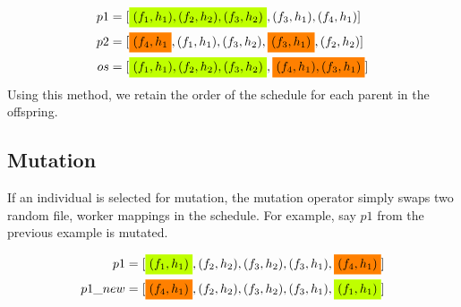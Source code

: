 \begin{align}
 p1 & = [\mathcolorbox{lime}{(f_1, h_1), (f_2, h_2), (f_3, h_2)}, (f_3, h_1), (f_4, h_1)] \nonumber \\
 p2 & = [\mathcolorbox{orange}{(f_4, h_1}, (f_1, h_1),(f_3, h_2), \mathcolorbox{orange}{(f_3, h_1)}, (f_2, h_2)] \nonumber \\
 os & = [\mathcolorbox{lime}{(f_1, h_1), (f_2, h_2), (f_3, h_2)}, \mathcolorbox{orange}{(f_4, h_1), (f_3, h_1)}] \nonumber
\end{align}
Using this method, we retain the order of the schedule for each parent in the offspring.

\subsection*{Mutation}
If an individual is selected for mutation, the mutation operator simply swaps
two random file, worker mappings in the schedule. For example, say $p1$ from
the previous example is mutated.

\begin{align}
 p1 & = [\mathcolorbox{lime}{(f_1, h_1)}, (f_2, h_2), (f_3, h_2), (f_3, h_1), \mathcolorbox{orange}{(f_4, h_1)}] \nonumber \\
 p1\_new & = [\mathcolorbox{orange}{(f_4, h_1)}, (f_2, h_2), (f_3, h_2), (f_3, h_1),\mathcolorbox{lime}{(f_1, h_1)}] \nonumber
\end{align}

